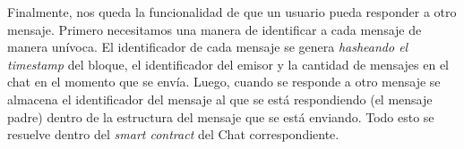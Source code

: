 Finalmente, nos queda la funcionalidad de que un usuario pueda responder a otro mensaje. Primero necesitamos una manera de identificar a cada mensaje de manera unívoca. El identificador de cada mensaje se genera \textit{hasheando el timestamp} del bloque, el identificador del emisor y la cantidad de mensajes en el chat en el momento que se envía. Luego, cuando se responde a otro mensaje se almacena el identificador del mensaje al que se está respondiendo (el mensaje padre) dentro de la estructura del mensaje que se está enviando. Todo esto se resuelve dentro del \textit{smart contract} del Chat correspondiente.
